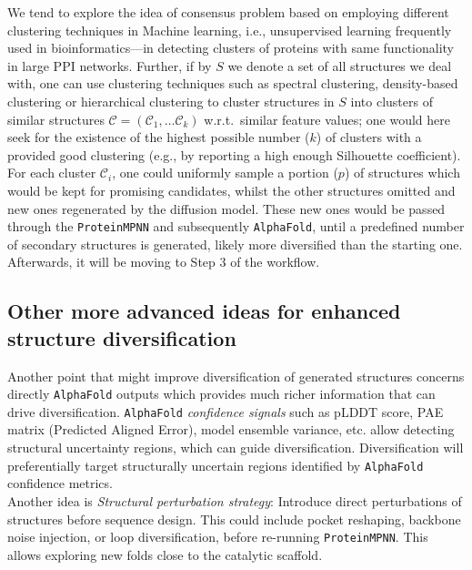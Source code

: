 \documentclass[runningheads]{llncs}
\begin{document}
	 We tend to explore the idea of consensus problem based on employing different clustering techniques in Machine learning, i.e., unsupervised learning frequently used in bioinformatics---in detecting clusters of proteins with same functionality~\cite{zou2020sequence} in large PPI networks. Further, if by $S$ we denote a set of all structures we deal with, one can use clustering techniques such as spectral clustering, density-based clustering or  hierarchical clustering to cluster structures in $S$ into clusters of similar structures $\mathcal{C}=(\mathcal{C}_1, \ldots \mathcal{C}_k)$ w.r.t.\ similar feature values; one would here seek for the existence of the highest possible number ($k$) of clusters with a provided good clustering (e.g., by reporting a high enough Silhouette coefficient). For each cluster $\mathcal{C}_i$, one could uniformly  sample a portion ($p$) of structures which would be kept for promising candidates, whilst the other structures omitted and new ones regenerated by the diffusion model. These new ones would be passed through the \texttt{ProteinMPNN} and subsequently \texttt{AlphaFold}, until a predefined number of secondary structures is generated, likely more diversified than the starting one. Afterwards, it will be moving to Step 3 of the workflow.

\subsection{Other more advanced ideas for enhanced structure diversification }
	 
 Another point that might improve diversification of generated structures concerns directly \texttt{AlphaFold} outputs which provides much richer information that can drive diversification. \texttt{AlphaFold} \textit{confidence signals} such as 
	 pLDDT score, PAE matrix (Predicted Aligned Error), model ensemble variance, etc.
	 allow detecting structural uncertainty regions, which can guide diversification. Diversification will preferentially target structurally uncertain regions identified by \texttt{AlphaFold} confidence metrics. \\
	 
	 Another idea is \textit{Structural perturbation strategy}: Introduce direct perturbations of structures before sequence design. This could include pocket reshaping, backbone noise injection, or loop diversification, before re-running \texttt{ProteinMPNN}. This allows exploring new folds close to the catalytic scaffold. \\ \vspace{0.2cm}
	 
\end{document}
